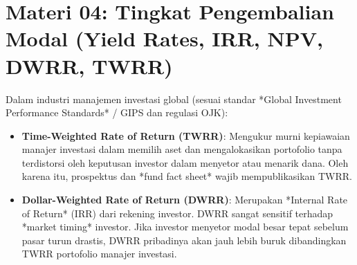 \documentclass[11pt,a4paper]{article}
\begin{document}
\newpage

\section*{Materi 04: Tingkat Pengembalian Modal (Yield Rates, IRR, NPV, DWRR, TWRR)}

\begin{kasusbox}
Dalam industri manajemen investasi global (sesuai standar *Global Investment Performance Standards* / GIPS dan regulasi OJK):
\begin{itemize}[leftmargin=4mm, topsep=1pt, itemsep=1pt]
    \item \textbf{Time-Weighted Rate of Return (TWRR)}: Mengukur murni kepiawaian manajer investasi dalam memilih aset dan mengalokasikan portofolio tanpa terdistorsi oleh keputusan investor dalam menyetor atau menarik dana. Oleh karena itu, prospektus dan *fund fact sheet* wajib mempublikasikan TWRR.
    \item \textbf{Dollar-Weighted Rate of Return (DWRR)}: Merupakan *Internal Rate of Return* (IRR) dari rekening investor. DWRR sangat sensitif terhadap *market timing* investor. Jika investor menyetor modal besar tepat sebelum pasar turun drastis, DWRR pribadinya akan jauh lebih buruk dibandingkan TWRR portofolio manajer investasi.
\end{itemize}
\end{kasusbox}
\end{document}
